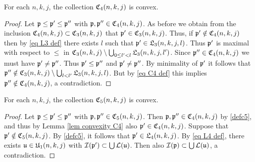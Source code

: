 \begin{lemma}
    \label{lem convexity C4}
    For each $n,k,j$, the collection $\mathfrak C_4(n,k,j)$ is convex.
\end{lemma}

\begin{proof}
    Let $\mathfrak p \le \mathfrak p' \le\mathfrak p''$ with $\mathfrak p, \mathfrak p'' \in \mathfrak C_4(n,k,j)$. As before we obtain from the inclusion $\mathfrak C_4(n,k,j) \subset \mathfrak C_3(n,k,j)$ that $\mathfrak p' \in \mathfrak C_3(n,k,j)$. Thus, if $\mathfrak p' \notin \mathfrak C_4(n,k,j)$ then by \eqref{eq L3 def} there exists $l$ such that $\mathfrak p' \in \mathfrak L_3(n,k,j,l)$. Thus $\mathfrak p'$ is maximal with respect to $\le$ in $\mathfrak C_3(n,k,j) \setminus \bigcup_{0 \le l' < l} \mathfrak L_3(n,k,j,l')$.  Since $\mathfrak p'' \in \mathfrak C_4(n,k,j)$ we must have $\mathfrak p' \ne \mathfrak p''$. Thus $\mathfrak p' \le \mathfrak p''$ and $\mathfrak p'\ne \mathfrak p''$. By minimality of $\mathfrak p'$ it follows that $\mathfrak p'' \notin \mathfrak C_3(n,k,j) \setminus \bigcup_{l < l'} \mathfrak L_3(n,k,j,l)$. But by \eqref{eq C4 def} this implies $\mathfrak p'' \notin \mathfrak C_4(n,k,j)$, a contradiction.
\end{proof}

\begin{lemma}
    \label{lem convexity C5}
    For each $n,k,j$, the collection $\mathfrak C_5(n,k,j)$ is convex.
\end{lemma}

\begin{proof}
    Let $\mathfrak p \le \mathfrak p' \le\mathfrak p''$ with $\mathfrak p, \mathfrak p'' \in \mathfrak C_5(n,k,j)$. Then $\mathfrak p, \mathfrak p'' \in \mathfrak C_4(n,k,j)$ by \eqref{defc5}, and thus by Lemma \ref{lem convexity C4} also $\mathfrak p' \in \mathfrak C_4(n,k,j)$. Suppose that $\mathfrak p' \notin \mathfrak C_5(n,k,j)$. By \eqref{defc5}, it follows that $\mathfrak p' \in \mathfrak L_4(n,k,j)$.
    By \eqref{eq L4 def}, there exists $\mathfrak u \in \mathfrak U_1(n,k,j)$ with $\mathcal{I}(\mathfrak p') \subset \bigcup \mathcal{L}(\mathfrak u)$. Then also $\mathcal{I}(\mathfrak p) \subset \bigcup \mathcal{L}(\mathfrak u)$, a contradiction.
\end{proof}

